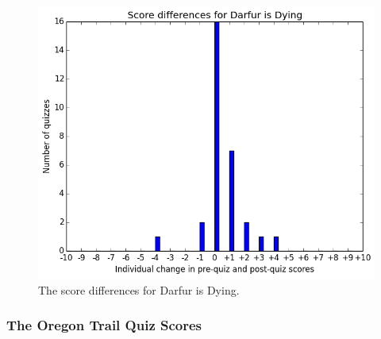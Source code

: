 			\begin{figure}[h] 
			\centering 
			\includegraphics[width=\textwidth]{darfur_results.png} 
			\caption{The score differences for Darfur is Dying.}
			\end{figure}


	\cleardoublepage

		\subsubsection{The Oregon Trail Quiz Scores}

			

